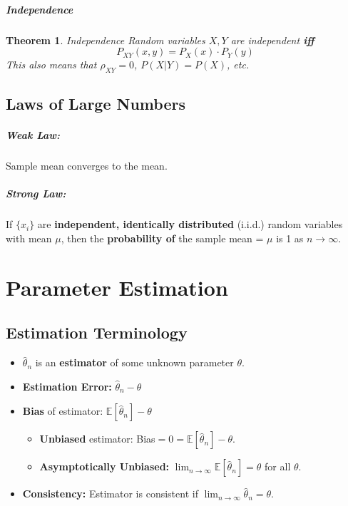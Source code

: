 \documentclass[a4paper,12pt]{report}
\newtheorem{theorem}{Theorem}
\begin{document}
\paragraph{Independence} 
\begin{theorem}{Independence}
Random variables $X,Y$ are independent \textbf{iff} 
\begin{equation}
P_{XY}(x,y) = P_X(x) \cdot P_Y(y)
\end{equation}
This also means that $\rho_{XY} = 0$, $P(X|Y) = P(X)$, etc.
\end{theorem}



\section{Laws of Large Numbers}

\paragraph{Weak Law: } Sample mean converges to the mean.

\paragraph{Strong Law: } If $\{x_i\}$ are \textbf{independent, identically distributed} (i.i.d.) random variables with mean $\mu$, then the \textbf{probability of} the sample mean = $\mu$ is 1 as $n\to \infty$.

\chapter{Parameter Estimation}

\section{Estimation Terminology}

\begin{itemize}
\item $\hat \theta_n$ is an \textbf{estimator} of some unknown parameter $\theta$.
\item \textbf{Estimation Error: } $\hat \theta_n - \theta$
\item \textbf{Bias} of estimator:  $\mathbb E[\hat \theta_n] - \theta$
\begin{itemize}
\item \textbf{Unbiased} estimator:  Bias$=0 = \mathbb E[\hat \theta_n] - \theta$.
\item \textbf{Asymptotically Unbiased: } $\lim_{n\to \infty} \mathbb E[\hat \theta_n] = \theta$ for all $\theta$.
\end{itemize}
\item \textbf{Consistency: } Estimator is consistent if $\lim_{n\to \infty} \hat \theta_n = \theta$.
\end{itemize}
\end{document}

